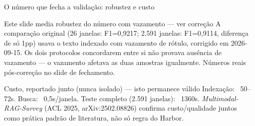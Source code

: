 \documentclass{beamer}
\newenvironment{decisaobloco}[1]{\begin{alertblock}{#1}}{\end{alertblock}}
\begin{document}
\begin{frame}{O número que fecha a validação: robustez e custo}
  \small
  \begin{alertblock}{Este slide media robustez do número com vazamento — ver correção}
    A comparação original (26 janelas: F1=0,9217; 2.591 janelas: F1=0,9114, diferença de só 1pp)
    usava o texto indexado com vazamento de rótulo, corrigido em 2026-09-15. Os dois protocolos
    concordarem entre si não provava ausência de vazamento — o vazamento afetava as duas
    amostras igualmente. Números reais pós-correção no slide de fechamento.
  \end{alertblock}

  \pause
  \begin{decisaobloco}{Custo, reportado junto (nunca isolado) — isto permanece válido}
    Indexação: ~50--72s. Busca: ~0,5s/janela. Teste completo (2.591 janelas): ~1360s.
    \emph{Multimodal-RAG-Survey} (ACL 2025, arXiv:2502.08826) confirma custo/qualidade juntos
    como prática padrão de literatura, não só regra do Harbor.
  \end{decisaobloco}
\end{frame}
\end{document}
